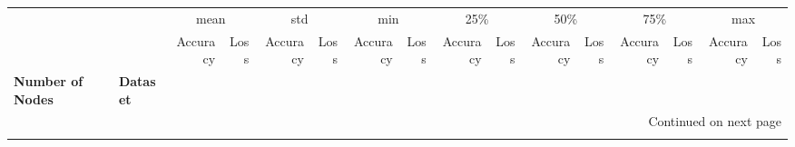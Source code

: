 \begin{longtable}{llrrrrrrrrrrrrrr}
\toprule
   &               & \multicolumn{2}{c}{mean} & \multicolumn{2}{c}{std} & \multicolumn{2}{c}{min} & \multicolumn{2}{c}{25\%} & \multicolumn{2}{c}{50\%} & \multicolumn{2}{c}{75\%} & \multicolumn{2}{c}{max} \\
   &               & Accuracy &    Loss & Accuracy &    Loss & Accuracy &    Loss & Accuracy &    Loss & Accuracy &    Loss & Accuracy &    Loss & Accuracy &    Loss \\
\textbf{Number of Nodes} & \textbf{Dataset} &          &         &          &         &          &         &          &         &          &         &          &         &          &         \\
\midrule
\endhead
\midrule
\multicolumn{16}{r}{{Continued on next page}} \\
\midrule
\endfoot


\end{longtable}
